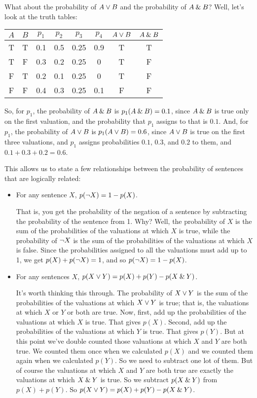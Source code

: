 What about the probability of $A \vee B$ and the probability of $A\mathbin{\&} B$? Well, let's look at the truth tables:
\begin{center}
\begin{tabular}{cc|c|c|c|c|c|c}
$A$ & $B$ & $p_1$ & $p_2$ & $p_3$ & $p_4$ & $A \vee B$ & $A\mathbin{\&} B$ \\
\hline
T & T &  0.1 & 0.5 & 0.25 & 0.9& T & T \\
T & F  & 0.3 & 0.2 & 0.25 & 0 & T & F\\
F & T  & 0.2 & 0.1 & 0.25 & 0 & T & F\\
F & F  & 0.4 & 0.3 & 0.25 & 0.1 & F & F
\end{tabular}
\end{center}
So, for $p_1$, the probability of $A\mathbin{\&} B$ is $p_1(A\mathbin{\&} B) = 0.1$, since $A\mathbin{\&} B$ is true only on the first valuation, and the probability that $p_1$ assigns to that is $0.1$. And, for $p_1$, the probability of $A \vee B$ is $p_1(A \vee B) = 0.6$, since $A \vee B$ is true on the first three valuations, and $p_1$ assigns probabilities $0.1$, $0.3$, and $0.2$ to them, and $0.1 + 0.3 + 0.2 = 0.6$.

This allows us to state a few relationships between the probability of sentences that are logically related:
\begin{itemize}
\item For any sentence $X$, $p(\neg X) = 1 - p(X)$.

That is, you get the probability of the negation of a sentence by subtracting the probability of the sentence from 1. Why? Well, the probability of $X$ is the sum of the probabilities of the valuations at which $X$ is true, while the probability of $\neg X$ is the sum of the probabilities of the valuations at which $X$ is false. Since the probabilities assigned to all the valuations must add up to 1, we get $p(X) + p(\neg X) = 1$, and so $p(\neg X) = 1 - p(X)$.
\item For any sentences $X$, $p(X \vee Y) = p(X) + p(Y) - p(X\mathbin{\&} Y)$. 

It's worth thinking this through. The probability of $X \vee Y$ is the sum of the probabilities of the valuations at which $X \vee Y$ is true; that is, the valuations at which $X$ or $Y$ or both are true. Now, first, add up the probabilities of the valuations at which $X$ is true. That gives $p(X)$. Second, add up the probabilities of the valuations at which $Y$ is true. That gives $p(Y)$. But at this point we've double counted those valuations at which $X$ and $Y$ are both true. We counted them once when we calculated $p(X)$ and we counted them again when we calculated $p(Y)$. So we need to subtract one lot of them. But of course the valuations at which $X$ and $Y$ are both true are exactly the valuations at which $X\mathbin{\&} Y$ is true. So we subtract $p(X\mathbin{\&} Y)$ from $p(X) + p(Y)$. So $p(X \vee Y) = p(X) + p(Y) - p(X\mathbin{\&} Y)$.
\end{itemize}

